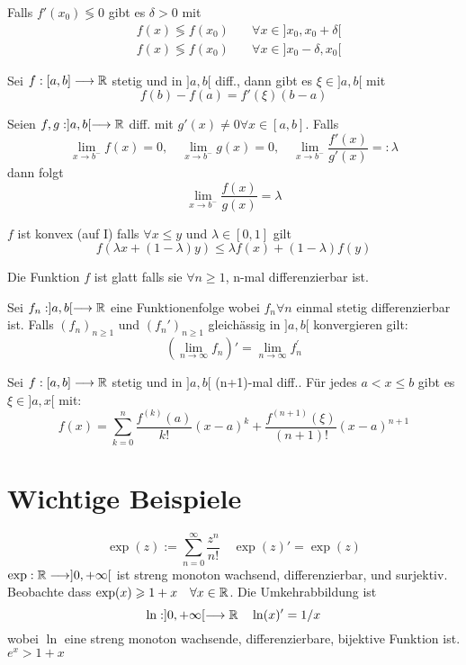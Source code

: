 \Satz Falls $f'(x_0) \lessgtr 0$ gibt es $\delta > 0$ mit
\begin{align*}
	&f(x) \lessgtr f(x_0) \quad &\forall x \in ]x_0, x_0+\delta[ \\
	&f(x) \lessgtr f(x_0) \quad &\forall x \in ]x_0-\delta, x_0[ 
\end{align*}

\Satz[Lagrange] Sei $f:[a,b] \longrightarrow \mathbb{R}$ stetig und in $]a,b[$ diff., dann gibt es $\xi \in ]a,b[$ mit
$$f(b)-f(a) = f'(\xi)(b-a)$$

\Satz[L'Hospital] Seien $f,g: ]a,b[ \longrightarrow \mathbb{R}$ diff. mit $g'(x) \neq 0 \forall x \in [a,b]$. Falls
$$\lim _{x \rightarrow b^{-}} f(x)=0, \quad \lim _{x \rightarrow b^{-}} g(x)=0, \quad \lim _{x \rightarrow b^{-}} \frac{f'(x)}{g'(x)}=:\lambda$$
dann folgt
$$\lim _{x \rightarrow b^{-}} \frac{f(x)}{g(x)}=\lambda$$


\Def[Konvex] $f$ ist konvex (auf I) falls $\forall x \leq y$ und $\lambda \in [0,1]$ gilt
$$f(\lambda x+(1-\lambda) y) \leqslant \lambda f(x)+(1-\lambda) f(y)$$

\Def[Glatt] Die Funktion $f$ ist glatt falls sie $\forall n \geq 1$, n-mal differenzierbar ist.

\Satz[Funktionenfolgen] Sei $f_n:]a,b[ \longrightarrow \mathbb{R}$ eine Funktionenfolge wobei $f_n \forall n$ einmal stetig differenzierbar ist. Falls $(f_n)_{n\geqslant1}$ und $(f_n')_{n\geqslant1}$ gleichässig in $]a,b[$ konvergieren gilt:
$$(\lim _{n \rightarrow \infty} f_{n})'=\lim _{n \rightarrow \infty} f_{n}^{\prime}$$

 Sei $f:[a,b] \longrightarrow \mathbb{R}$ stetig und in $]a,b[$ (n+1)-mal diff.. Für jedes $a<x\leqslant b$ gibt es $\xi \in ]a,x[$ mit:
$$f(x)=\sum_{k=0}^{n} \frac{f^{(k)}(a)}{k !}(x-a)^{k}+\frac{f^{(n+1)}(\xi)}{(n+1) !}(x-a)^{n+1}$$


\section{Wichtige Beispiele}
\Bsp[Exponentialfunktion]
$$\exp (z):=\sum_{n=0}^{\infty} \frac{z^{n}}{n !} \quad \exp (z)' = \exp(z)$$
$\exp : \mathbb{R} \longrightarrow] 0,+\infty[$ ist streng monoton wachsend, differenzierbar, und surjektiv. Beobachte dass $\exp (x) \geqslant 1+x \quad \forall x \in \mathbb{R}$.
Die Umkehrabbildung ist 
$$\ln :] 0,+\infty[\longrightarrow \mathbb{R} \quad \ln (x)' = 1/x$$
wobei $\ln$ eine streng monoton wachsende, differenzierbare, bijektive Funktion ist. \\
\Lemma $e^x > 1+x$

